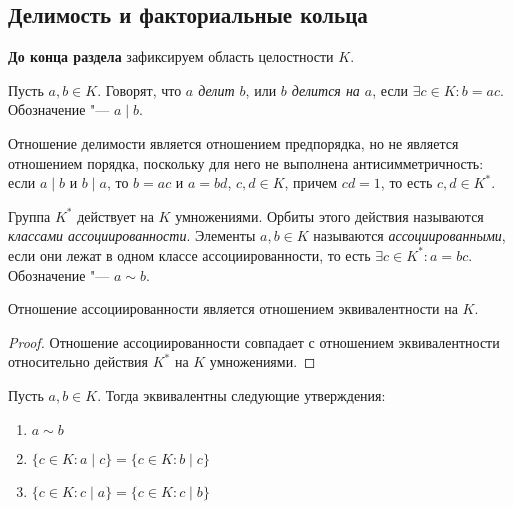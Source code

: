 \subsection{Делимость и факториальные кольца}

\textbf{До конца раздела} зафиксируем область целостности $K$.

\begin{definition}
	Пусть $a, b \in K$. Говорят, что \textit{$a$ делит $b$}, или \textit{$b$ делится на $a$}, если $\exists c \in K: b = ac$. Обозначение "--- $a \mid b$.
\end{definition}

\begin{note}
	Отношение делимости является отношением предпорядка, но не является отношением порядка, поскольку для него не выполнена антисимметричность: если $a \mid b$ и $b \mid a$, то $b = ac$ и $a = bd$, $c, d \in K$, причем $cd = 1$, то есть $c, d \in K^*$.
\end{note}

\begin{definition}
	Группа $K^*$ действует на $K$ умножениями. Орбиты этого действия называются \textit{классами ассоциированности}. Элементы $a, b \in K$ называются \textit{ассоциированными}, если они лежат в одном классе ассоциированности, то есть $\exists c \in K^*: a = bc$. Обозначение "--- $a \sim b$.
\end{definition}

\begin{proposition}
	Отношение ассоциированности является отношением эквивалентности на $K$.
\end{proposition}

\begin{proof}
	Отношение ассоциированности совпадает с отношением эквивалентности относительно действия $K^*$ на $K$ умножениями.
\end{proof}

\begin{proposition}
	Пусть $a, b \in K$. Тогда эквивалентны следующие утверждения:
	\begin{enumerate}
		\item $a \sim b$
		
		\item $\{c \in K: a \mid c\} = \{c \in K: b \mid c\}$
		
		\item $\{c \in K: c \mid a\} = \{c \in K: c \mid b\}$
	\end{enumerate}
\end{proposition}

